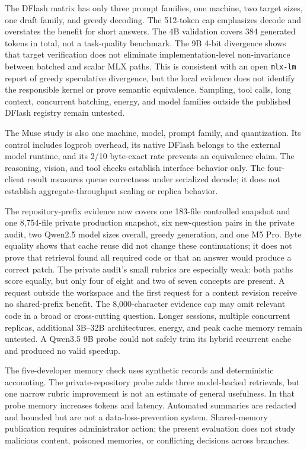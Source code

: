 \documentclass[11pt]{article}
\begin{document}
The DFlash matrix has only three prompt families, one machine, two target sizes,
one draft family, and greedy decoding. The 512-token cap emphasizes decode and
overstates the benefit for short answers. The 4B validation covers 384 generated
tokens in total, not a task-quality benchmark. The 9B 4-bit divergence shows that
target verification does not eliminate implementation-level non-invariance
between batched and scalar MLX paths. This is consistent with an open
\texttt{mlx-lm} report of greedy speculative divergence, but the local evidence
does not identify the responsible kernel or prove semantic equivalence. Sampling,
tool calls, long context, concurrent batching, energy, and model families outside
the published DFlash registry remain untested.

The Muse study is also one machine, model, prompt family, and quantization. Its
control includes logprob overhead, its native DFlash belongs to the external
model runtime, and its 2/10 byte-exact rate prevents an equivalence claim. The
reasoning, vision, and tool checks establish interface behavior only. The
four-client result measures queue correctness under serialized decode; it does
not establish aggregate-throughput scaling or replica behavior.

The repository-prefix evidence now covers one 183-file controlled snapshot and
one 8,754-file private production snapshot, six new-question pairs in the
private audit, two Qwen2.5 model sizes overall, greedy generation, and one M5
Pro. Byte equality shows that cache reuse did not change these continuations;
it does not prove that retrieval found all required code or that an answer would
produce a correct patch. The private audit's small rubrics are especially weak:
both paths score equally, but only four of eight and two of seven concepts are
present. A request outside the workspace and the first request for a content
revision receive no shared-prefix benefit. The 8,000-character evidence cap may
omit relevant code in a broad or cross-cutting question. Longer sessions,
multiple concurrent replicas, additional 3B--32B architectures, energy, and
peak cache memory remain untested. A Qwen3.5 9B probe could not safely trim its
hybrid recurrent cache and produced no valid speedup.

The five-developer memory check uses synthetic records and deterministic
accounting. The private-repository probe adds three model-backed retrievals, but
one narrow rubric improvement is not an estimate of general usefulness. In that
probe memory increases tokens and latency. Automated summaries are redacted and
bounded but are not a data-loss-prevention system. Shared-memory publication
requires administrator action; the present evaluation does not study malicious
content, poisoned memories, or conflicting decisions across branches.
\end{document}
